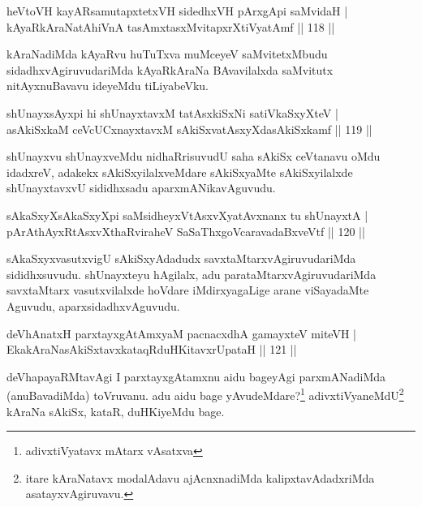 
\begin{shl}
heVtoVH kayARsamutapxtetxVH sidedhxVH pArxgApi saMvidaH |\\
kAyaRkAraNatAhiVnA tasAmxtasxMvitapxrXtiVyatAmf \hfill || 118 ||
\end{shl}

\begin{artha}%
kAraNadiMda kAyaRvu huTuTxva muMceyeV saMvitetxMbudu sidadhxvAgiruvudariMda kAyaRkAraNa BAvavilalxda saMvitutx nitAyxnuBavavu ideyeMdu tiLiyabeVku.
\end{artha}


\begin{shl}
shUnayxsAyxpi hi shUnayxtavxM tatAsxkiSxNi satiVkaSxyXteV |\\
asAkiSxkaM ceVcUCxnayxtavxM sAkiSxvatAsxyXdasAkiSxkamf \hfill || 119 ||
\end{shl}

\begin{artha}
shUnayxvu shUnayxveMdu nidhaRrisuvudU saha sAkiSx ceVtanavu oMdu idadxreV, adakekx sAkiSxyilalxveMdare sAkiSxyaMte sAkiSxyilalxde shUnayxtavxvU sididhxsadu aparxmANikavAguvudu.
\end{artha}

\begin{shl}
sAkaSxyXsAkaSxyXpi saMsidheyxVtAsxvXyatAvxnanx tu shUnayxtA |\\
pArAthAyxRtAsxvXthaRviraheV SaSaThxgoVcaravadaBxveVtf \hfill || 120 ||
\end{shl}

\begin{artha}
sAkaSxyxvasutxvigU sAkiSxyAdadudx savxtaMtarxvAgiruvudariMda sididhxsuvudu. shUnayxteyu hAgilalx, adu parataMtarxvAgiruvudariMda savxtaMtarx vasutxvilalxde hoVdare iMdirxyagaLige arane viSayadaMte Aguvudu, aparxsidadhxvAguvudu.
\end{artha}

\begin{shl}
deVhAnatxH parxtayxgAtAmx\s yaM pacnacxdhA gamayxteV miteVH |\\
EkakAraNasAkiSxtavxkataqRduHKitavxrUpataH \hfill || 121 ||
\end{shl}

\begin{artha}
deVhapayaRMtavAgi I parxtayxgAtamxnu aidu bageyAgi parxmANadiMda (anuBavadiMda) toVruvanu. adu aidu bage yAvudeMdare?\footnote[1]{adivxtiVyatavx mAtarx vAsatxva} adivxtiVyaneMdU\footnote[2]{itare kAraNatavx modalAdavu ajAcnxnadiMda kalipxtavAdadxriMda asatayxvAgiruvavu.} kAraNa sAkiSx, kataR, duHKiyeMdu bage.
\end{artha}

